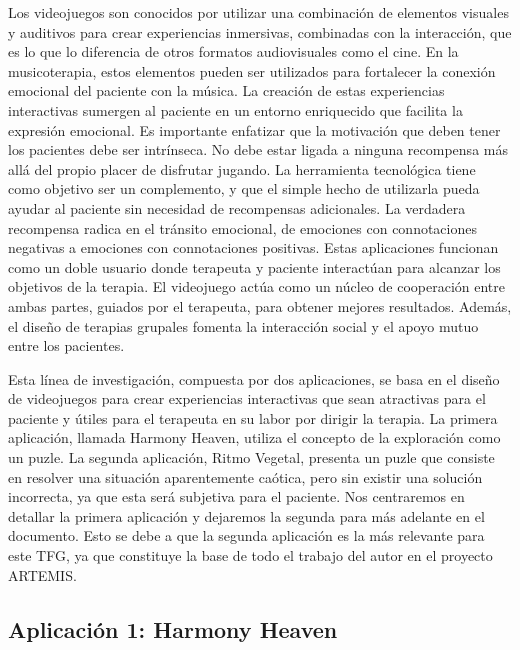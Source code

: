 Los videojuegos son conocidos por utilizar una combinación de elementos visuales y auditivos para crear experiencias inmersivas, combinadas con la interacción, que es lo que lo diferencia de otros formatos audiovisuales como el cine. En la musicoterapia, estos elementos pueden ser utilizados para fortalecer la conexión emocional del paciente con la música. La creación de estas experiencias interactivas sumergen al paciente en un entorno enriquecido que facilita la expresión emocional. Es importante enfatizar que la motivación que deben tener los pacientes debe ser intrínseca. No debe estar ligada a ninguna recompensa más allá del propio placer de disfrutar jugando. La herramienta tecnológica tiene como objetivo ser un complemento, y que el simple hecho de utilizarla pueda ayudar al paciente sin necesidad de recompensas adicionales. La verdadera recompensa radica en el tránsito emocional, de emociones con connotaciones negativas a emociones con connotaciones positivas. Estas aplicaciones funcionan como un doble usuario donde terapeuta y paciente interactúan para alcanzar los objetivos de la terapia. El videojuego actúa como un núcleo de cooperación entre ambas partes, guiados por el terapeuta, para obtener mejores resultados. Además, el diseño de terapias grupales fomenta la interacción social y el apoyo mutuo entre los pacientes. 

Esta línea de investigación, compuesta por dos aplicaciones, se basa en el diseño de videojuegos para crear experiencias interactivas que sean atractivas para el paciente y útiles para el terapeuta en su labor por dirigir la terapia. La primera aplicación, llamada Harmony Heaven, utiliza el concepto de la exploración como un puzle. La segunda aplicación, Ritmo Vegetal, presenta un puzle que consiste en resolver una situación aparentemente caótica, pero sin existir una solución incorrecta, ya que esta será subjetiva para el paciente. Nos centraremos en detallar la primera aplicación y dejaremos la segunda para más adelante en el documento. Esto se debe a que la segunda aplicación es la más relevante para este TFG, ya que constituye la base de todo el trabajo del autor en el proyecto ARTEMIS.

\subsection{Aplicación 1: Harmony Heaven}

